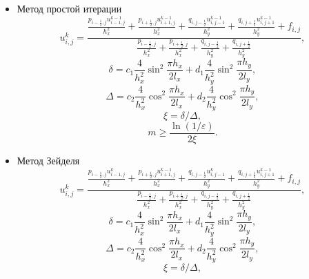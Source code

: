 \begin{itemize}
  \item Метод простой итерации
  \begin{equation}
    u_{i, j}^k = \frac{\frac{p_{i-\frac{1}{2}, j} u_{i-1, j}^{k-1}}{h_x^2} + \frac{p_{i+\frac{1}{2}, j} u_{i+1, j}^{k-1}}{h_x^2} + \frac{q_{i, j-\frac{1}{2}} u_{i, j-1}^{k-1}}{h_y^2} + \frac{q_{i, j+\frac{1}{2}} u_{i, j+1}^{k-1}}{h_y^2} + f_{i, j}}{\frac{p_{i-\frac{1}{2}, j}}{h_x^2} + \frac{p_{i+\frac{1}{2}, j}}{h_x^2} + \frac{q_{i, j-\frac{1}{2}}}{h_y^2} + \frac{q_{i, j+\frac{1}{2}}}{h_y^2}},
  \end{equation}
  \begin{equation}
    \delta = c_1 \frac{4}{h_x^2} \sin^2{\frac{\pi h_x}{2 l_x}} + d_1 \frac{4}{h_y^2} \sin^2{\frac{\pi h_y}{2 l_y}},
  \end{equation}
  \begin{equation}
    \Delta = c_2 \frac{4}{h_x^2} \cos^2{\frac{\pi h_x}{2 l_x}} + d_2 \frac{4}{h_y^2} \cos^2{\frac{\pi h_y}{2 l_y}},
  \end{equation}
  \begin{equation}
    \xi = \delta / \Delta,
  \end{equation}
  \begin{equation}
    m \geqslant \frac{\ln(1 / \varepsilon)}{2 \xi}.
  \end{equation}
  \item Метод Зейделя
  \begin{equation}
    u_{i, j}^k = \frac{\frac{p_{i-\frac{1}{2}, j} u_{i-1, j}^k}{h_x^2} + \frac{p_{i+\frac{1}{2}, j} u_{i+1, j}^{k-1}}{h_x^2} + \frac{q_{i, j-\frac{1}{2}} u_{i, j-1}^k}{h_y^2} + \frac{q_{i, j+\frac{1}{2}} u_{i, j+1}^{k-1}}{h_y^2} + f_{i, j}}{\frac{p_{i-\frac{1}{2}, j}}{h_x^2} + \frac{p_{i+\frac{1}{2}, j}}{h_x^2} + \frac{q_{i, j-\frac{1}{2}}}{h_y^2} + \frac{q_{i, j+\frac{1}{2}}}{h_y^2}},
  \end{equation}
  \begin{equation}
    \delta = c_1 \frac{4}{h_x^2} \sin^2{\frac{\pi h_x}{2 l_x}} + d_1 \frac{4}{h_y^2} \sin^2{\frac{\pi h_y}{2 l_y}},
  \end{equation}
  \begin{equation}
    \Delta = c_2 \frac{4}{h_x^2} \cos^2{\frac{\pi h_x}{2 l_x}} + d_2 \frac{4}{h_y^2} \cos^2{\frac{\pi h_y}{2 l_y}},
  \end{equation}
  \begin{equation}
    \xi = \delta / \Delta,
  \end{equation}
  \begin{equation}

\end{equation}
\end{itemize}
